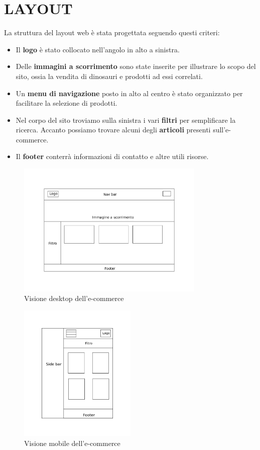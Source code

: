 \section{LAYOUT}
La struttura del layout web è stata progettata seguendo questi criteri:
\begin{itemize}
    \item Il \textbf{logo} è stato collocato nell'angolo in alto a sinistra.
    \item Delle \textbf{immagini a scorrimento} sono state inserite per illustrare lo scopo del sito, ossia la vendita di dinosauri e prodotti ad essi correlati.
    \item Un \textbf{menu di navigazione}  posto in alto al centro è stato organizzato per facilitare la selezione di prodotti.
    \item Nel corpo del sito troviamo sulla sinistra i vari \textbf{filtri} per semplificare la ricerca. Accanto possiamo trovare alcuni degli \textbf{articoli} presenti sull'e-commerce. 
    \item Il \textbf{footer} conterrà informazioni di contatto e altre utili risorse.
\end{itemize}
  \begin{figure}[H]
        \centering
        \includegraphics[width=0.80\textwidth]{immagini/desktop_view.png}
        \caption{Visione desktop dell'e-commerce}
    \end{figure}

 \begin{figure}[H]
        \centering
        \includegraphics[width=0.50\textwidth]{immagini/mobile_view.png}
        \caption{Visione mobile dell'e-commerce}
    \end{figure}